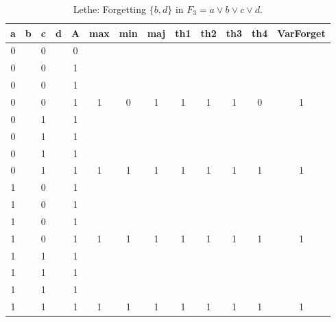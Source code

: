 \begin{table}[!tb]
    \centering
    \begin{tabular}{|c|c|c|c|c|c|c|c|c|c|c|c|c|}
        \hline
        \textbf{a} & \textbf{b} & \textbf{c} & \textbf{d} & \textbf{A} & \textbf{max} & \textbf{min} & \textbf{maj} & \textbf{th1} & \textbf{th2} & \textbf{th3} & \textbf{th4} & \textbf{VarForget} \\ \hline
        \rowcolor{gray!40} 0 &  & 0 &  & 0 &  &  &  &  &  &  &  &  \\ \hline
        \rowcolor{gray!40} 0 &  & 0 &  & 1 &  &  &  &  &  &  &  &  \\ \hline
        \rowcolor{gray!40} 0 &  & 0 &  & 1 &  &  &  &  &  &  &  &  \\ \hline
        \rowcolor{gray!40} 0 &  & 0 &  & 1 & 1 & 0 & 1 & 1 & 1 & 1 & 0 & 1 \\ \hline
        \rowcolor{blue!40} 0 &  & 1 &  & 1 &  &  &  &  &  &  &  &  \\ \hline
        \rowcolor{blue!40} 0 &  & 1 &  & 1 &  &  &  &  &  &  &  &  \\ \hline
        \rowcolor{blue!40} 0 &  & 1 &  & 1 &  &  &  &  &  &  &  &  \\ \hline
        \rowcolor{blue!40} 0 &  & 1 &  & 1 & 1 & 1 & 1 & 1 & 1 & 1 & 1 & 1 \\ \hline
        \rowcolor{red!40} 1 &  & 0 &  & 1 &  &  &  &  &  &  &  &  \\ \hline
        \rowcolor{red!40} 1 &  & 0 &  & 1 &  &  &  &  &  &  &  &  \\ \hline
        \rowcolor{red!40} 1 &  & 0 &  & 1 &  &  &  &  &  &  &  &  \\ \hline
        \rowcolor{red!40} 1 &  & 0 &  & 1 & 1 & 1 & 1 & 1 & 1 & 1 & 1 & 1 \\ \hline
        \rowcolor{green!40} 1 &  & 1 &  & 1 &  &  &  &  &  &  &  &  \\ \hline
        \rowcolor{green!40} 1 &  & 1 &  & 1 &  &  &  &  &  &  &  &  \\ \hline
        \rowcolor{green!40} 1 &  & 1 &  & 1 &  &  &  &  &  &  &  &  \\ \hline
        \rowcolor{green!40} 1 &  & 1 &  & 1 & 1 & 1 & 1 & 1 & 1 & 1 & 1 & 1 \\ \hline
    \end{tabular}
    \caption{Lethe: Forgetting $\{b, d\}$ in $F_{3} = a \lor b \lor c \lor d$.}
    \label{tab:lethe-F3-bd}
\end{table}

